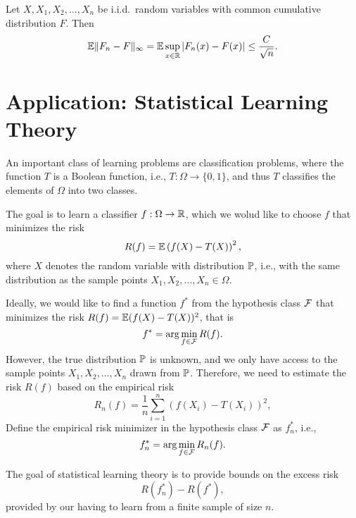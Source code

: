 \begin{theorem}
	Let \(X,X_{1},X_{2},\ldots,X_{n}\) be i.i.d.\ random variables with common cumulative distribution \(F\). Then
	\begin{equation*}
		\mathbb{E}\|F_{n}-F\|_{\infty}=\mathbb{E}\sup_{x\in\mathbb{R}}|F_{n}(x)-F(x)|\leq\frac{C}{\sqrt{n}}.
	\end{equation*}
\end{theorem}

\section{Application: Statistical Learning Theory}

An important class of learning problems are classification problems, where the function \(T\) is a Boolean function, i.e., \(T:\Omega\to\{0,1\}\), and thus \(T\) classifies the elements of \(\Omega\) into two classes.

The goal is to learn a classifier \(f:\Omega\to\mathbb{R}\), which we wolud like to choose \(f\) that minimizes the risk
\begin{equation*}
	R(f)=\mathbb{E}\left(f(X)-T(X)\right)^{2},
\end{equation*}
where \(X\) denotes the random variable with distribution \(\mathbb{P}\), i.e., with the same distribution as the sample points \(X_{1},X_{2},\ldots,X_{n}\in\Omega\).

Ideally, we would like to find a function \(f^{*}\) from the hypothesis class \(\mathcal{F}\) that minimizes the risk \(R(f)=\mathbb{E}(f(X)-T(X))^{2}\), that is
\begin{equation*}
	f^{*}=\arg\min_{f\in\mathcal{F}}R(f).
\end{equation*}
However, the true distribution \(\mathbb{P}\) is unknown, and we only have access to the sample points \(X_{1},X_{2},\ldots,X_{n}\) drawn from \(\mathbb{P}\). Therefore, we need to estimate the risk \(R(f)\) based on the empirical risk
\begin{equation*}
	R_{n}(f)=\frac{1}{n}\sum_{i=1}^{n}(f(X_{i})-T(X_{i}))^{2},
\end{equation*}
Define the empirical risk minimizer in the hypothesis class \(\mathcal{F}\) as \(f_{n}^{*}\), i.e.,
\begin{equation*}
	f_{n}^{*}=\arg\min_{f\in\mathcal{F}}R_{n}(f).
\end{equation*}

The goal of statistical learning theory is to provide bounds on the excess risk
\begin{equation*}
	R(f_{n}^{*})-R(f^{*}),
\end{equation*}
provided by our having to learn from a finite sample of size \(n\).

